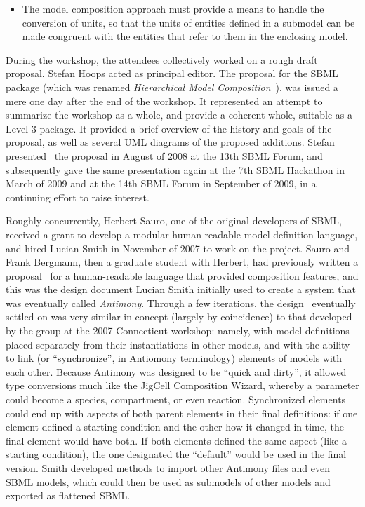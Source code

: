 \begin{enumerate}
\begin{itemize}
    \item The model composition approach must provide a means to handle
      the conversion of units, so that the units of entities defined in
      a submodel can be made congruent with the entities that refer to
      them in the enclosing model.

    \end{itemize}

\end{enumerate}

During the workshop, the attendees collectively worked on a rough draft
proposal.  Stefan Hoops acted as principal editor.  The proposal for the
SBML package (which was renamed \emph{Hierarchical Model
  Composition}~\cite{x}), was issued a mere one day after the end of the
workshop.  It represented an attempt to summarize the workshop as a
whole, and provide a coherent whole, suitable as a Level 3 package.  It
provided a brief overview of the history and goals of the proposal, as
well as several UML diagrams of the proposed additions.  Stefan
presented~\cite{x} the proposal in August of 2008 at the 13th SBML Forum,
and subsequently gave the same presentation again at the 7th SBML
Hackathon in March of 2009 and at the 14th SBML Forum in September of
2009, in a continuing effort to raise interest.

Roughly concurrently, Herbert Sauro, one of the original developers of
SBML, received a grant to develop a modular human-readable model
definition language, and hired Lucian Smith in November of 2007 to work
on the project.  Sauro and Frank Bergmann, then a graduate student with
Herbert, had previously written a proposal~\cite{x} for a human-readable
language that provided composition features, and this was the design
document Lucian Smith initially used to create a system that was
eventually called \emph{Antimony}. Through a few iterations, the
design~\cite{x} eventually settled on was very similar in concept
(largely by coincidence) to that developed by the group at the 2007
Connecticut workshop: namely, with model definitions placed separately
from their instantiations in other models, and with the ability to link
(or ``synchronize'', in Antiomony terminology) elements of models with
each other.  Because Antimony was designed to be ``quick and dirty'', it
allowed type conversions much like the JigCell Composition Wizard,
whereby a parameter could become a species, compartment, or even
reaction.  Synchronized elements could end up with aspects of both
parent elements in their final definitions: if one element defined a
starting condition and the other how it changed in time, the final
element would have both.  If both elements defined the same aspect (like
a starting condition), the one designated the ``default'' would be used
in the final version.  Smith developed methods to import other Antimony
files and even SBML models, which could then be used as submodels of
other models and exported as flattened SBML.

